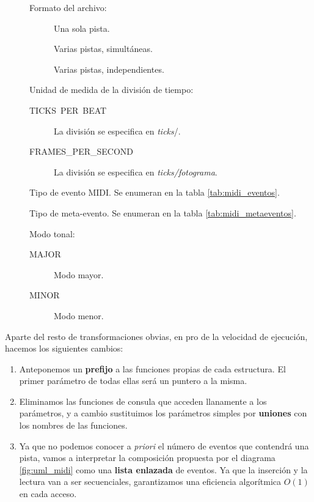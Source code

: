 \begin{description}
	\item[] Formato del archivo:
	
	\begin{description}
		\item[] Una sola pista.
		\item[] Varias pistas, simultáneas.
		\item[] Varias pistas, independientes.
	\end{description}
	
	\item[] Unidad de medida de la división de tiempo:
	
	\begin{description}
		\item[TICKS\ PER\ BEAT] La división se especifica en \textit{ticks}/\quarternote.
		\item[FRAMES\_PER\_SECOND] La división se especifica en \textit{ticks/fotograma}.
	\end{description}
	
	\item[] Tipo de evento \acrshort{MIDI}. Se enumeran en la tabla \ref{tab:midi_eventos}.
	\item[] Tipo de meta-evento. Se enumeran en la tabla \ref{tab:midi_metaeventos}.
	
	\item[] Modo tonal:
	
	\begin{description}
		\item[MAJOR] Modo mayor.
		\item[MINOR] Modo menor.
	\end{description}
\end{description}

Aparte del resto de transformaciones obvias, en pro de la velocidad de ejecución, hacemos los siguientes cambios:

\begin{enumerate}
	\item Anteponemos un \textbf{prefijo} a las funciones propias de cada estructura. El primer parámetro de todas ellas será un puntero a la misma.
	
	\item Eliminamos las funciones de consula que acceden llanamente a los parámetros, y a cambio sustituimos los parámetros simples por \textbf{uniones} con los nombres de las funciones.
	
	\item Ya que no podemos conocer a \textit{priori} el número de eventos que contendrá una pista, vamos a interpretar la composición propuesta por el diagrama \ref{fig:uml_midi} como una \textbf{lista enlazada} de eventos. Ya que la inserción y la lectura van a ser secuenciales, garantizamos una eficiencia algorítmica $O(1)$ en cada acceso.
\end{enumerate}

